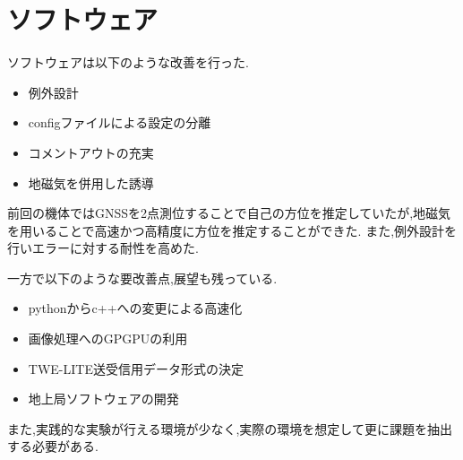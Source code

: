 \part*{ソフトウェア}
ソフトウェアは以下のような改善を行った.
\begin{itemize}
  \item 例外設計
  \item configファイルによる設定の分離
  \item コメントアウトの充実
  \item 地磁気を併用した誘導
\end{itemize}
前回の機体ではGNSSを2点測位することで自己の方位を推定していたが,地磁気を用いることで高速かつ高精度に方位を推定することができた.
また,例外設計を行いエラーに対する耐性を高めた.

一方で以下のような要改善点,展望も残っている.
\begin{itemize}
  \item pythonからc++への変更による高速化
  \item 画像処理へのGPGPUの利用
  \item TWE-LITE送受信用データ形式の決定
  \item 地上局ソフトウェアの開発
\end{itemize}
また,実践的な実験が行える環境が少なく,実際の環境を想定して更に課題を抽出する必要がある.

